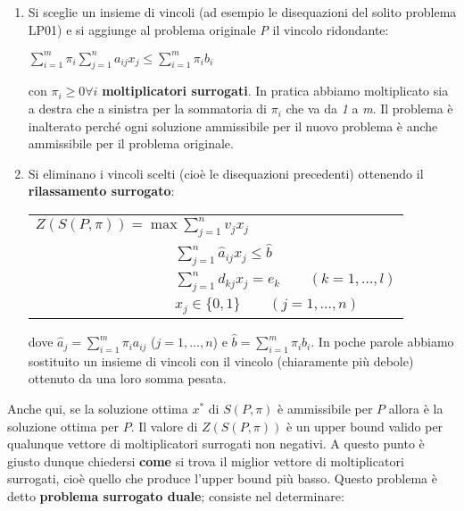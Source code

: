 \documentclass[11pt]{book}
\begin{document}
\begin{enumerate}

\item Si sceglie un insieme di vincoli (ad esempio le disequazioni
  del solito problema LP01) e si aggiunge al problema originale {\em
    P} il vincolo ridondante:

  \begin{center}
    $\sum\limits_{i=1}^m \pi_i \sum\limits_{j=1}^n a_{ij}x_j \leq
    \sum_{i=1}^m \pi_i b_i$
  \end{center}

  con $\pi_i \geq 0 \forall i$ {\bf moltiplicatori surrogati}. In
  pratica abbiamo moltiplicato sia a destra che a sinistra per la
  sommatoria di $\pi_i$ che va da {\em 1} a {\em m}. Il problema \`e
  inalterato perch\'e ogni soluzione ammissibile per il nuovo problema
  \`e anche ammissibile per il problema originale.

\item Si eliminano i vincoli scelti (cio\`e le disequazioni
  precedenti) ottenendo il {\bf rilassamento surrogato}:

  
  \vspace{11pt}
  \begin{center}
    \begin{tabular}{l}
      $Z(S(P,\pi)) = \max \sum \limits_{j=1}^n v_j x_j$\\
      $\phantom{Z(S(P,\pi)) = max} \sum \limits_{j=1}^n \hat{a}_{ij}x_j \leq \hat{b}$\\
      $\phantom{Z(S(P,\pi)) = max} \sum \limits_{j=1}^n d_{kj}x_j = e_k \qquad (k=1,\dots,l)$\\
      $\phantom{Z(S(P,\pi)) = max} x_j \in \{0,1\} \qquad (j=1,\dots,n)$
    \end{tabular}
  \end{center}
  \vspace{11pt}    
  
  dove $\hat{a}_j = \sum\limits_{i=1}^m \pi_ia_{ij}$ ($j=1,\dots,n$) e
  $\hat{b} = \sum\limits_{i=1}^m \pi_ib_i$. In poche parole abbiamo
  sostituito un insieme di vincoli con il vincolo (chiaramente pi\`u
  debole) ottenuto da una loro somma pesata.  

\end{enumerate}

Anche qui, se la soluzione ottima $x^*$ di $S(P,\pi)$ \`e ammissibile
per $P$ allora \`e la soluzione ottima per $P$. Il valore di
$Z(S(P,\pi))$ \`e un upper bound valido per qualunque vettore di
moltiplicatori surrogati non negativi. A questo punto \`e giusto
dunque chiedersi {\bf come} si trova il miglior vettore di
moltiplicatori surrogati, cio\`e quello che produce l'upper bound
pi\`u basso. Questo problema \`e detto {\bf problema surrogato duale};
consiste nel determinare:
\end{document}
